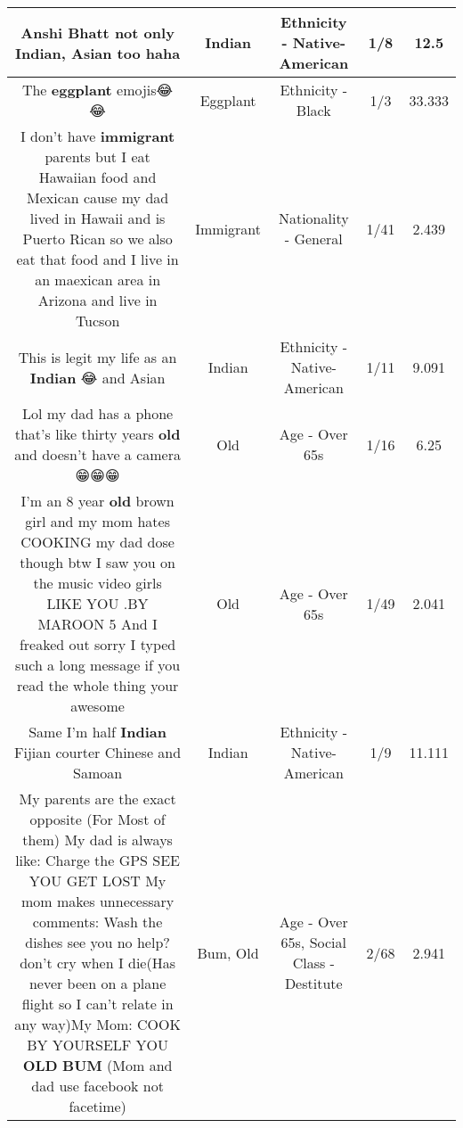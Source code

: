 \documentclass[11pt]{article}
\newlength\mylength
\begin{document}
\begin{center}
\begin{longtable}{|C{.65\mylength}|C{.30\mylength}|C{.12\mylength}|C{.12\mylength}|C{.12\mylength}|}
  \small Anshi Bhatt not only \textbf{Indian}, Asian too haha\normalsize   & Indian & Ethnicity - Native-American & 1/8 & 12.5 \\  \hline
  \small The \textbf{eggplant} emojis😂😂\normalsize   & Eggplant & Ethnicity - Black & 1/3 & 33.333 \\  \hline
  \small I don't have \textbf{immigrant} parents but I eat Hawaiian food and Mexican cause my dad lived in Hawaii and is Puerto Rican so we also eat that food and I live in an maexican area in Arizona and live in Tucson\normalsize   & Immigrant & Nationality - General & 1/41 & 2.439 \\  \hline
  \small This is legit my life as an \textbf{Indian} 😂 and Asian\normalsize   & Indian & Ethnicity - Native-American & 1/11 & 9.091 \\  \hline
  \small Lol my dad has a phone that's like thirty years \textbf{old} and doesn't have a camera😁😁😁\normalsize   & Old & Age - Over 65s & 1/16 & 6.25 \\  \hline
  \small I'm an 8 year \textbf{old} brown girl and my mom hates COOKING my dad dose though btw I saw you on the music video girls LIKE YOU .BY MAROON 5 And I freaked out sorry I typed such a long message if you read the whole thing your awesome\normalsize   & Old & Age - Over 65s & 1/49 & 2.041 \\  \hline
  \small Same I'm half \textbf{Indian} Fijian courter Chinese and Samoan\normalsize   & Indian & Ethnicity - Native-American & 1/9 & 11.111 \\  \hline
  \small My parents are the exact opposite (For Most of them) My dad is always like: Charge the GPS SEE YOU GET LOST My mom makes unnecessary comments: Wash the dishes see you no help? don't cry when I die(Has never been on a plane flight so I can't relate in any way)My Mom: COOK BY YOURSELF YOU \textbf{OLD} \textbf{BUM} (Mom and dad use facebook not facetime)\normalsize   & Bum, Old & Age - Over 65s, Social Class - Destitute & 2/68 & 2.941 \\  \hline

\end{longtable}
\end{center}
\end{document}
